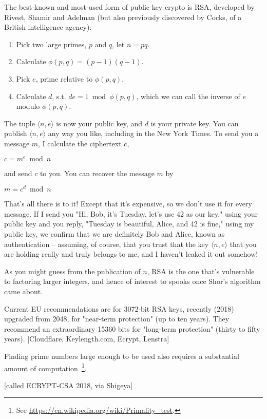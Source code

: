 \documentclass[%
 aip,
 jmp,%
 amsmath,amssymb,
 reprint,%
]{revtex4-1}
\begin{document}
The best-known and most-used form of public key crypto is RSA, developed by Rivest, Shamir and Adelman (but also previously discovered by Cocks, of a British intelligence agency):

\begin{enumerate}
\item Pick two large primes, $p$ and $q$, let $n = pq$.
\item Calculate $\phi(p,q) = (p-1)(q-1)$.
\item Pick $e$, prime relative to $\phi(p,q)$.
\item Calculate $d$, s.t. $de = 1 \bmod \phi(p,q)$,
  which we can call the inverse of $e$ modulo $\phi(p,q)$.
\end{enumerate}

The tuple $\langle n,e\rangle$ is now your public key, and $d$ is your private key.
You can publish $\langle n,e\rangle$ any way you like, including in the New York
Times. To send you a message $m$, I calculate the ciphertext $c$,

$c = m^e \bmod n$

and send $c$ to you.  You can recover the message $m$ by

$m = c^d \bmod n$

That's all there is to it!  Except that it's expensive, so we don't
use it for every message.  If I send you "Hi, Bob, it's Tuesday, let's
use 42 as our key," using your public key and you reply, "Tuesday is
beautiful, Alice, and 42 is fine," using my public key, we confirm
that we are definitely Bob and Alice, known as authentication --
assuming, of course, that you trust that the key $\langle n,e\rangle$
that you are holding really and truly belongs to me, and I haven't
leaked it out somehow!

As you might guess from the publication of $n$, RSA is the one that's
vulnerable to factoring larger integers, and hence of interest to
spooks once Shor's algorithm came about.

Current EU recommendations are for 3072-bit RSA keys, recently (2018)
upgraded from 2048, for "near-term protection" (up to ten years).
They recommend an extraordinary 15360 bits for "long-term protection"
(thirty to fifty years). [Cloudflare, Keylength.com, Ecrypt, Lenstra]

Finding prime numbers large enough to be used also requires a
substantial amount of computation~\footnote{See
  \url{https://en.wikipedia.org/wiki/Primality_test}.}.

[called ECRYPT-CSA 2018, via Shigeya]
\end{document}
